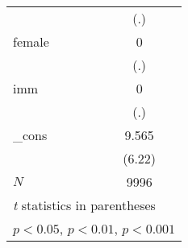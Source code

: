 {\begin{tabular}{l*{1}{c}}
            &         (.)         \\
[1em]
female      &           0         \\
            &         (.)         \\
[1em]
imm         &           0         \\
            &         (.)         \\
[1em]
\_cons      &       9.565\sym{***}\\
            &      (6.22)         \\
\hline
\(N\)       &        9996         \\
\hline\hline
\multicolumn{2}{l}{\footnotesize \textit{t} statistics in parentheses}\\
\multicolumn{2}{l}{\footnotesize \sym{*} \(p<0.05\), \sym{**} \(p<0.01\), \sym{***} \(p<0.001\)}\\
\end{tabular}
}
